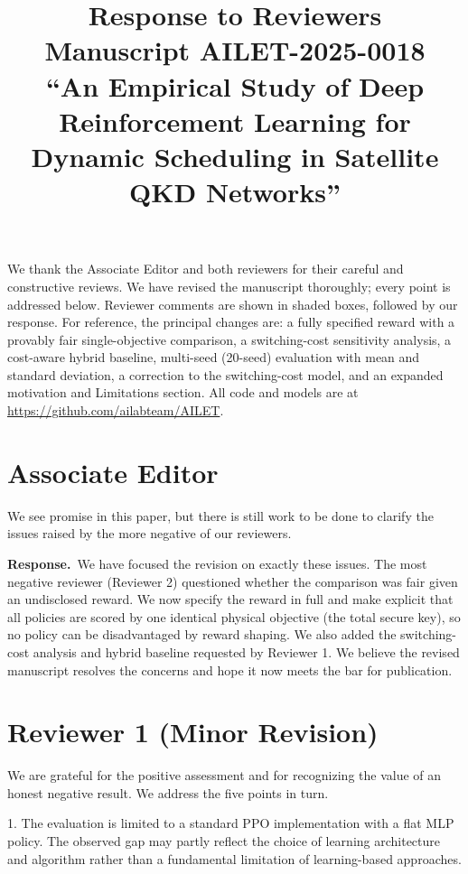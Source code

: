 \documentclass[11pt]{article}
\title{\vspace{-2.5em}Response to Reviewers\\[0.3em]
\large Manuscript AILET-2025-0018\\[0.2em]
\normalsize ``An Empirical Study of Deep Reinforcement Learning for Dynamic
Scheduling in Satellite QKD Networks''}
\author{}
\date{}
\newcommand{\resp}{\par\smallskip\noindent\textbf{Response.}\ }
\begin{document}
\maketitle
\vspace{-3em}

We thank the Associate Editor and both reviewers for their careful and constructive
reviews. We have revised the manuscript thoroughly; every point is addressed below.
Reviewer comments are shown in shaded boxes, followed by our response. For
reference, the principal changes are: a fully specified reward with a provably fair
single-objective comparison, a switching-cost sensitivity analysis, a cost-aware
hybrid baseline, multi-seed (20-seed) evaluation with mean and standard deviation,
a correction to the switching-cost model, and an expanded motivation and Limitations
section. All code and models are at \url{https://github.com/ailabteam/AILET}.

\section*{Associate Editor}

\begin{rc}
We see promise in this paper, but there is still work to be done to clarify the
issues raised by the more negative of our reviewers.
\end{rc}

\resp We have focused the revision on exactly these issues. The most negative
reviewer (Reviewer 2) questioned whether the comparison was fair given an
undisclosed reward. We now specify the reward in full and make explicit that all
policies are scored by one identical physical objective (the total secure key), so
no policy can be disadvantaged by reward shaping. We also added the switching-cost
analysis and hybrid baseline requested by Reviewer 1. We believe the revised
manuscript resolves the concerns and hope it now meets the bar for publication.

\section*{Reviewer 1 (Minor Revision)}

We are grateful for the positive assessment and for recognizing the value of an
honest negative result. We address the five points in turn.

\begin{rc}
1. The evaluation is limited to a standard PPO implementation with a flat MLP
policy. The observed gap may partly reflect the choice of learning architecture and
algorithm rather than a fundamental limitation of learning-based approaches.
\end{rc}
\end{document}
